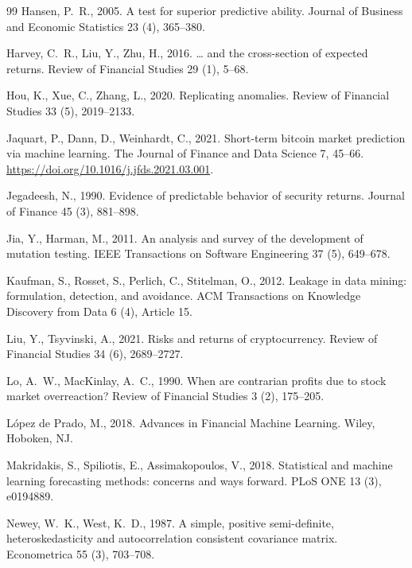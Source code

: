 \documentclass[preprint,12pt,authoryear,a4paper]{elsarticle}
\begin{document}
\begin{thebibliography}{99}
Hansen, P.~R., 2005.
A test for superior predictive ability.
Journal of Business and Economic Statistics 23 (4), 365--380.

Harvey, C.~R., Liu, Y., Zhu, H., 2016.
\ldots{} and the cross-section of expected returns.
Review of Financial Studies 29 (1), 5--68.

Hou, K., Xue, C., Zhang, L., 2020.
Replicating anomalies.
Review of Financial Studies 33 (5), 2019--2133.

Jaquart, P., Dann, D., Weinhardt, C., 2021.
Short-term bitcoin market prediction via machine learning.
The Journal of Finance and Data Science 7, 45--66.
\url{https://doi.org/10.1016/j.jfds.2021.03.001}.

Jegadeesh, N., 1990.
Evidence of predictable behavior of security returns.
Journal of Finance 45 (3), 881--898.

Jia, Y., Harman, M., 2011.
An analysis and survey of the development of mutation testing.
IEEE Transactions on Software Engineering 37 (5), 649--678.

Kaufman, S., Rosset, S., Perlich, C., Stitelman, O., 2012.
Leakage in data mining: formulation, detection, and avoidance.
ACM Transactions on Knowledge Discovery from Data 6 (4), Article 15.

Liu, Y., Tsyvinski, A., 2021.
Risks and returns of cryptocurrency.
Review of Financial Studies 34 (6), 2689--2727.

Lo, A.~W., MacKinlay, A.~C., 1990.
When are contrarian profits due to stock market overreaction?
Review of Financial Studies 3 (2), 175--205.

L\'opez de Prado, M., 2018.
Advances in Financial Machine Learning.
Wiley, Hoboken, NJ.

Makridakis, S., Spiliotis, E., Assimakopoulos, V., 2018.
Statistical and machine learning forecasting methods: concerns and ways forward.
PLoS ONE 13 (3), e0194889.

Newey, W.~K., West, K.~D., 1987.
A simple, positive semi-definite, heteroskedasticity and autocorrelation
consistent covariance matrix.
Econometrica 55 (3), 703--708.


\end{thebibliography}
\end{document}
